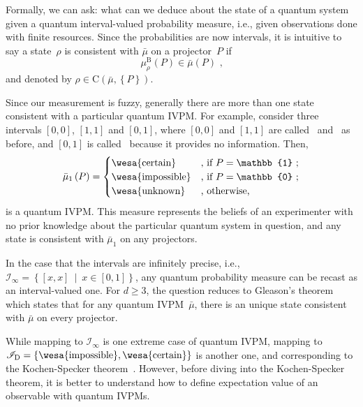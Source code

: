 \documentclass[english,reprint, aps, prl,superscriptaddress, showpacs,
showkeys, longbibliography, amsmath, amssymb]{revtex4-1}
\theoremstyle{plain}
\theoremstyle{definition}
\newcommand{\imposs}{{\text{\wesa{impossible}}}}
\newcommand{\necess}{{\text{\wesa{certain}}}}
\newcommand{\unknown}{{\text{\wesa{unknown}}}}
\newcommand{\set}[2]{\ensuremath{\left\{ {#1}~\middle|~{#2}\right\} }}
\newcommand{\coreBorn}{\mathrm{C}}
\begin{document}
Formally, we can ask: what can we deduce about the state of a quantum
system given a quantum interval-valued probability measure, i.e.,
given observations done with finite resources. Since the probabilities
are now intervals, it is intuitive to say a state~$\rho$ is consistent
with $\bar{\mu}$ on a projector~$P$ if 
\begin{equation}
\mu_{\rho}^{\mathrm{B}}\left(P\right)\in\bar{\mu}\left(P\right)\textrm{ ,}
\end{equation}
and denoted by $\rho\in\coreBorn\left(\bar{\mu},\left\{ P\right\} \right)$.

Since our measurement is fuzzy, generally there are more than one
state consistent with a particular quantum IVPM. For example, consider
three intervals $\left[0,0\right]$, $\left[1,1\right]$ and \emph{$\left[0,1\right]$},
where $\left[0,0\right]$ and $\left[1,1\right]$ are called \imposs~and
\necess~as before, and \emph{$\left[0,1\right]$} is called \unknown~because
it provides no information. Then,
\begin{equation}
\bar{\mu}_{1}\left(P\right)=\begin{cases}
\necess & \text{, if }P=\mathbb{1}\text{ ;}\\
\imposs & \text{, if }P=\mathbb{0}\text{ ;}\\
\unknown & \text{, otherwise,}
\end{cases}\label{eq:homomorphism-1}
\end{equation}
is a quantum IVPM. This measure represents the beliefs of an experimenter
with no prior knowledge about the particular quantum system in question,
and any state is consistent with $\bar{\mu}_{1}$ on any projectors.

In the case that the intervals are infinitely precise, i.e., $\mathscr{I}_{\infty}=\set{\left[x,x\right]}{x\in\left[0,1\right]}$,
any quantum probability measure can be recast as an interval-valued
one. For $d\ge3$, the question reduces to Gleason's theorem which
states that for any quantum IVPM~$\bar{\mu}$, there is an unique
state consistent with $\bar{\mu}$ on every projector.

While mapping to $\mathscr{I}_{\infty}$ is one extreme case of quantum
IVPM, mapping to $\mathscr{I}_{\mathrm{D}}=\left\{ \imposs,\necess\right\} $
is another one, and corresponding to the Kochen-Specker theorem~\cite{kochenspecker1967,peres1995quantum,Redhead1987-REDINA}.
However, before diving into the Kochen-Specker theorem, it is better
to understand how to define expectation value of an observable with
quantum IVPMs.
\end{document}
